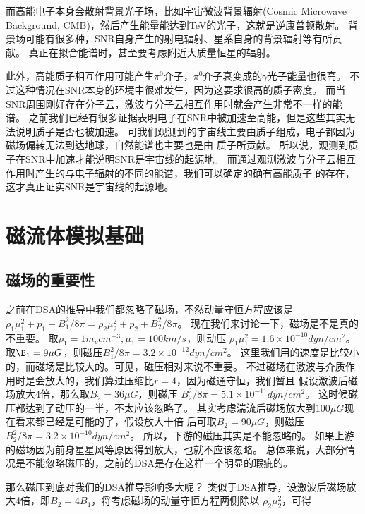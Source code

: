 而高能电子本身会散射背景光子场，比如宇宙微波背景辐射(Cosmic Microwave Background,
CMB)，然后产生能量能达到TeV的光子，这就是逆康普顿散射。
背景场可能有很多种，SNR自身产生的射电辐射、星系自身的背景辐射等有所贡献。
真正在拟合能谱时，甚至要考虑附近大质量恒星的辐射。

此外，高能质子相互作用可能产生$\pi^0$介子，$\pi^0$介子衰变成的$\gamma$光子能量也很高。
不过这种情况在SNR本身的环境中很难发生，因为这要求很高的质子密度。
而当SNR周围刚好存在分子云，激波与分子云相互作用时就会产生非常不一样的能谱。
之前我们已经有很多证据表明电子在SNR中被加速至高能，但是这些其实无法说明质子是否也被加速。
可我们观测到的宇宙线主要由质子组成，电子都因为磁场偏转无法到达地球，自然能谱也主要也是由
质子所贡献。
所以说，观测到质子在SNR中加速才能说明SNR是宇宙线的起源地。
而通过观测激波与分子云相互作用时产生的与电子辐射的不同的能谱，我们可以确定的确有高能质子
的存在，这才真正证实SNR是宇宙线的起源地。



\section{磁流体模拟基础}
\label{TheoryMHD}

\subsection{磁场的重要性}
之前在DSA的推导中我们都忽略了磁场，不然动量守恒方程应该是
$\rho_1\mu_1^2+p_1+B_1^2/8\pi=\rho_2\mu_2^2+p_2+B_2^2/8\pi$。
现在我们来讨论一下，磁场是不是真的不重要。
取$\rho_1=1 m_p cm^{-3}, \mu_1 = 100 km/s$，则动压
$\rho_1\mu_1^2=1.6 \times 10^{-10} dyn/cm^{2}$。
取$\B_1=9\mu G$，则磁压$B_1^2/8\pi=3.2 \times 10^{-12} dyn/cm^{2}$。
这里我们用的速度是比较小的，而磁场是比较大的。可见，磁压相对来说不重要。
不过磁场在激波与介质作用时是会放大的，我们算过压缩比$r=4$，因为磁通守恒，我们暂且
假设激波后磁场放大4倍，那么取$B_2=36\mu G$，则磁压
$B_2^2/8\pi=5.1 \times 10^{-11} dyn/cm^{2}$。
这时候磁压都达到了动压的一半，不太应该忽略了。
其实考虑湍流后磁场放大到$100\mu G$现在看来都已经是可能的了\citep{Ji2016b}，假设放大十倍
后可取$B_2=90\mu G$，则磁压$B_2^2/8\pi=3.2 \times 10^{-10} dyn/cm^{2}$。
所以，下游的磁压其实是不能忽略的。
如果上游的磁场因为前身星星风等原因得到放大，也就不应该忽略。
总体来说，大部分情况是不能忽略磁压的，之前的DSA是存在这样一个明显的瑕疵的。

那么磁压到底对我们的DSA推导影响多大呢？
类似于DSA推导，设激波后磁场放大4倍，即$B_2=4B_1$，将考虑磁场的动量守恒方程两侧除以
$\rho_2\mu_2^2$，可得

